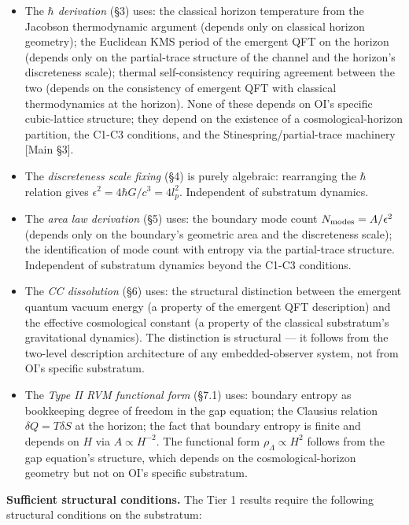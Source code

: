 \documentclass[
]{article}
\begin{document}
\begin{itemize}
\item
  The \emph{\(\hbar\) derivation} (§3) uses: the classical horizon
  temperature from the Jacobson thermodynamic argument (depends only on
  classical horizon geometry); the Euclidean KMS period of the emergent
  QFT on the horizon (depends only on the partial-trace structure of the
  channel and the horizon's discreteness scale); thermal
  self-consistency requiring agreement between the two (depends on the
  consistency of emergent QFT with classical thermodynamics at the
  horizon). None of these depends on OI's specific cubic-lattice
  structure; they depend on the existence of a cosmological-horizon
  partition, the C1-C3 conditions, and the Stinespring/partial-trace
  machinery {[}Main §3{]}.
\item
  The \emph{discreteness scale fixing} (§4) is purely algebraic:
  rearranging the \(\hbar\) relation gives
  \(\epsilon^2 = 4 \hbar G/c^3 = 4 l_p^2\). Independent of substratum
  dynamics.
\item
  The \emph{area law derivation} (§5) uses: the boundary mode count
  \(N_{\rm modes} = A/\epsilon^2\) (depends only on the boundary's
  geometric area and the discreteness scale); the identification of mode
  count with entropy via the partial-trace structure. Independent of
  substratum dynamics beyond the C1-C3 conditions.
\item
  The \emph{CC dissolution} (§6) uses: the structural distinction
  between the emergent quantum vacuum energy (a property of the emergent
  QFT description) and the effective cosmological constant (a property
  of the classical substratum's gravitational dynamics). The distinction
  is structural --- it follows from the two-level description
  architecture of any embedded-observer system, not from OI's specific
  substratum.
\item
  The \emph{Type II RVM functional form} (§7.1) uses: boundary entropy
  as bookkeeping degree of freedom in the gap equation; the Clausius
  relation \(\delta Q = T \delta S\) at the horizon; the fact that
  boundary entropy is finite and depends on \(H\) via
  \(A \propto H^{-2}\). The functional form \(\rho_\Lambda \propto H^2\)
  follows from the gap equation's structure, which depends on the
  cosmological-horizon geometry but not on OI's specific substratum.
\end{itemize}

\textbf{Sufficient structural conditions.} The Tier 1 results require
the following structural conditions on the substratum:
\end{document}
